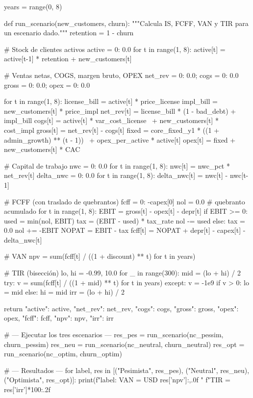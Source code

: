 \begin{APACode}[breaklines=true]
  years = range(0, 8)
  
  def run_scenario(new_customers, churn):
      """Calcula IS, FCFF, VAN y TIR para un escenario dado."""
      retention = 1 - churn
  
      # Stock de clientes activos
      active = {0: 0.0}
      for t in range(1, 8):
          active[t] = active[t-1] * retention + new_customers[t]
  
      # Ventas netas, COGS, margen bruto, OPEX
      net_rev = {0: 0.0}; cogs = {0: 0.0}
      gross   = {0: 0.0}; opex = {0: 0.0}
  
      for t in range(1, 8):
          license_bill = active[t] * price_license
          impl_bill    = new_customers[t] * price_impl
          net_rev[t]   = license_bill * (1 - bad_debt) + impl_bill
          cogs[t]      = active[t] * var_cost_license \
                        + new_customers[t] * cost_impl
          gross[t]     = net_rev[t] - cogs[t]
          fixed        = core_fixed_y1 * ((1 + admin_growth) ** (t - 1)) \
                        + opex_per_active * active[t]
          opex[t]      = fixed + new_customers[t] * CAC
  
      # Capital de trabajo
      nwc = {0: 0.0}
      for t in range(1, 8):
          nwc[t] = nwc_pct * net_rev[t]
      delta_nwc = {0: 0.0}
      for t in range(1, 8):
          delta_nwc[t] = nwc[t] - nwc[t-1]
  
      # FCFF (con traslado de quebrantos)
      fcff = {0: -capex[0]}
      nol = 0.0  # quebranto acumulado
      for t in range(1, 8):
          EBIT  = gross[t] - opex[t] - depr[t]
          if EBIT >= 0:
              used = min(nol, EBIT)
              tax  = (EBIT - used) * tax_rate
              nol -= used
          else:
              tax  = 0.0
              nol += -EBIT
          NOPAT = EBIT - tax
          fcff[t] = NOPAT + depr[t] - capex[t] - delta_nwc[t]
  
      # VAN
      npv = sum(fcff[t] / ((1 + discount) ** t) for t in years)
  
      # TIR (bisección)
      lo, hi = -0.99, 10.0
      for _ in range(300):
          mid = (lo + hi) / 2
          try:
              v = sum(fcff[t] / ((1 + mid) ** t) for t in years)
          except:
              v = -1e9
          if v > 0:
              lo = mid
          else:
              hi = mid
      irr = (lo + hi) / 2
  
      return {
          "active": active, "net_rev": net_rev, "cogs": cogs,
          "gross": gross, "opex": opex, "fcff": fcff,
          "npv": npv, "irr": irr
      }
  
  # --- Ejecutar los tres escenarios ---
  res_pes = run_scenario(nc_pessim,  churn_pessim)
  res_neu = run_scenario(nc_neutral, churn_neutral)
  res_opt = run_scenario(nc_optim,   churn_optim)
  
  # --- Resultados ---
  for label, res in [("Pesimista", res_pes),
                     ("Neutral",   res_neu),
                     ("Optimista", res_opt)]:
      print(f"{label}: VAN = USD {res['npv']:,.0f}  "
            f"TIR = {res['irr']*100:.2f}%
  \end{APACode}